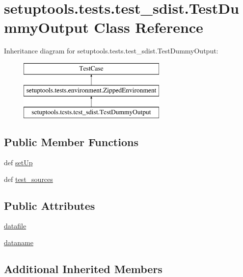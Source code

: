 \hypertarget{classsetuptools_1_1tests_1_1test__sdist_1_1TestDummyOutput}{}\section{setuptools.\+tests.\+test\+\_\+sdist.\+Test\+Dummy\+Output Class Reference}
\label{classsetuptools_1_1tests_1_1test__sdist_1_1TestDummyOutput}
Inheritance diagram for setuptools.\+tests.\+test\+\_\+sdist.\+Test\+Dummy\+Output\+:\begin{figure}[H]
\begin{center}
\leavevmode
\includegraphics[height=3.000000cm]{classsetuptools_1_1tests_1_1test__sdist_1_1TestDummyOutput}
\end{center}
\end{figure}
\subsection*{Public Member Functions}
\begin{DoxyCompactItemize}
\item 
def \hyperlink{classsetuptools_1_1tests_1_1test__sdist_1_1TestDummyOutput_ad16cc24979c4b1f5961eefa74cbc37b8}{set\+Up}
\item 
def \hyperlink{classsetuptools_1_1tests_1_1test__sdist_1_1TestDummyOutput_ab668cba996e046c60cd0eed0f9ece0b7}{test\+\_\+sources}
\end{DoxyCompactItemize}
\subsection*{Public Attributes}
\begin{DoxyCompactItemize}
\item 
\hyperlink{classsetuptools_1_1tests_1_1test__sdist_1_1TestDummyOutput_a41283a5ebdfa69fb6b7cf9bb372cde86}{datafile}
\item 
\hyperlink{classsetuptools_1_1tests_1_1test__sdist_1_1TestDummyOutput_af853e35b83f3c416afba102a1276b582}{dataname}
\end{DoxyCompactItemize}
\subsection*{Additional Inherited Members}



